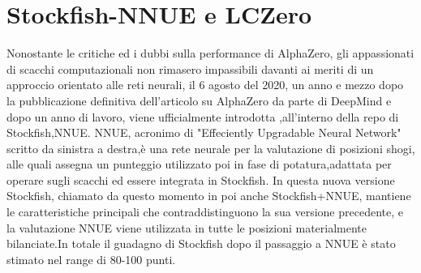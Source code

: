 \section{Stockfish-NNUE e LCZero}
Nonostante le critiche ed i dubbi sulla performance di AlphaZero, gli appassionati di scacchi computazionali non rimasero impassibili davanti ai meriti di un approccio orientato alle reti neurali,
il 6 agosto del 2020, un anno e mezzo dopo la pubblicazione definitiva dell'articolo su AlphaZero da parte di DeepMind e dopo un anno di lavoro, viene ufficialmente introdotta ,all'interno della repo di Stockfish,NNUE.
NNUE, acronimo di "Effeciently Upgradable Neural Network" scritto da sinistra a destra,è una rete neurale per la valutazione di posizioni shogi, alle quali assegna un punteggio
utilizzato poi in fase di potatura,adattata per operare sugli scacchi ed essere integrata in Stockfish.
In questa nuova versione Stockfish, chiamato da questo momento in poi anche Stockfish+NNUE, mantiene le caratteristiche principali che contraddistinguono la sua versione precedente, e la valutazione NNUE viene
utilizzata in tutte le posizioni materialmente bilanciate.In totale il guadagno di Stockfish dopo il passaggio a NNUE è stato stimato nel range di 80-100 punti.


